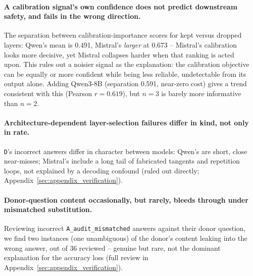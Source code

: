 \documentclass[11pt]{article}
\begin{document}
\paragraph{A calibration signal's own confidence does not predict
downstream safety, and fails in the wrong direction.} The separation
between calibration-importance scores for kept versus dropped layers:
Qwen's mean is 0.491, Mistral's \emph{larger} at 0.673 -- Mistral's
calibration looks more decisive, yet Mistral collapses harder when that
ranking is acted upon. This rules out a noisier signal as the
explanation: the calibration objective can be equally or more confident
while being less reliable, undetectable from its output alone. Adding
Qwen3-8B (separation 0.591, near-zero cost) gives a trend consistent with
this (Pearson $r=0.619$), but $n=3$ is barely more informative than
$n=2$.

\paragraph{Architecture-dependent layer-selection failures differ in
kind, not only in rate.} \texttt{D}'s incorrect answers differ in
character between models: Qwen's are short, close near-misses; Mistral's
include a long tail of fabricated tangents and repetition loops, not
explained by a decoding confound (ruled out directly;
Appendix~\ref{sec:appendix_verification}).

\paragraph{Donor-question content occasionally, but rarely, bleeds
through under mismatched substitution.} Reviewing incorrect
\texttt{A\_audit\_mismatched} answers against their donor question, we
find two instances (one unambiguous) of the donor's content leaking into
the wrong answer, out of 36 reviewed -- genuine but rare, not the
dominant explanation for the accuracy loss (full review in
Appendix~\ref{sec:appendix_verification}).
\end{document}
